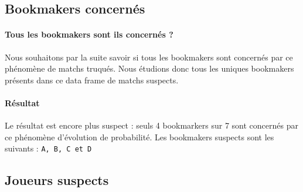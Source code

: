 \documentclass{report}
\begin{document}
\subsection{Bookmakers concernés}
\paragraph{Tous les bookmakers sont ils concernés ?}
Nous souhaitons par la suite savoir si tous les bookmakers sont concernés par ce
phénomène de matchs truqués. Nous étudions donc tous les uniques bookmakers
présents dans ce data frame de matchs suspects.
\paragraph{Résultat}
Le résultat est encore plus suspect : seuls 4 bookmarkers sur 7 sont concernés
par ce phénomène d'évolution de probabilité. Les bookmakers suspects sont les suivants : \verb+A, B, C et D+
\subsection{Joueurs suspects}
\end{document}
